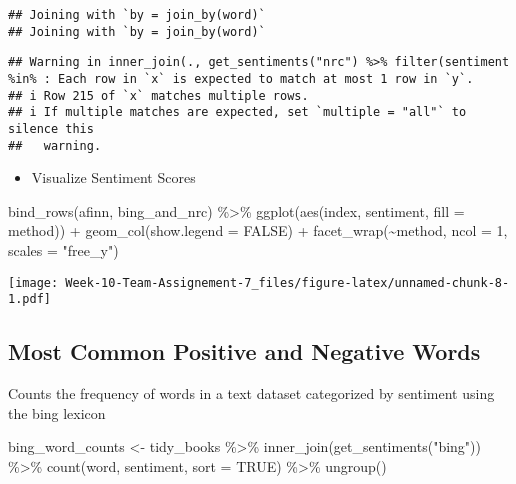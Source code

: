\documentclass[
]{article}
\newenvironment{Shaded}{\begin{snugshade}}{\end{snugshade}}
\newcommand{\AttributeTok}[1]{\textcolor[rgb]{0.77,0.63,0.00}{#1}}
\newcommand{\ConstantTok}[1]{\textcolor[rgb]{0.00,0.00,0.00}{#1}}
\newcommand{\DecValTok}[1]{\textcolor[rgb]{0.00,0.00,0.81}{#1}}
\newcommand{\FunctionTok}[1]{\textcolor[rgb]{0.00,0.00,0.00}{#1}}
\newcommand{\NormalTok}[1]{#1}
\newcommand{\OtherTok}[1]{\textcolor[rgb]{0.56,0.35,0.01}{#1}}
\newcommand{\SpecialCharTok}[1]{\textcolor[rgb]{0.00,0.00,0.00}{#1}}
\newcommand{\StringTok}[1]{\textcolor[rgb]{0.31,0.60,0.02}{#1}}
\providecommand{\tightlist}{%
  \setlength{\itemsep}{0pt}\setlength{\parskip}{0pt}}
\begin{document}
\begin{verbatim}
## Joining with `by = join_by(word)`
## Joining with `by = join_by(word)`
\end{verbatim}

\begin{verbatim}
## Warning in inner_join(., get_sentiments("nrc") %>% filter(sentiment %in% : Each row in `x` is expected to match at most 1 row in `y`.
## i Row 215 of `x` matches multiple rows.
## i If multiple matches are expected, set `multiple = "all"` to silence this
##   warning.
\end{verbatim}

\begin{itemize}
\tightlist
\item
  Visualize Sentiment Scores
\end{itemize}

\begin{Shaded}
\begin{Highlighting}[]
\FunctionTok{bind\_rows}\NormalTok{(afinn, }
\NormalTok{          bing\_and\_nrc) }\SpecialCharTok{\%\textgreater{}\%}
  \FunctionTok{ggplot}\NormalTok{(}\FunctionTok{aes}\NormalTok{(index, sentiment, }\AttributeTok{fill =}\NormalTok{ method)) }\SpecialCharTok{+}
  \FunctionTok{geom\_col}\NormalTok{(}\AttributeTok{show.legend =} \ConstantTok{FALSE}\NormalTok{) }\SpecialCharTok{+}
  \FunctionTok{facet\_wrap}\NormalTok{(}\SpecialCharTok{\textasciitilde{}}\NormalTok{method, }\AttributeTok{ncol =} \DecValTok{1}\NormalTok{, }\AttributeTok{scales =} \StringTok{"free\_y"}\NormalTok{)}
\end{Highlighting}
\end{Shaded}

\texttt{[image: Week-10-Team-Assignement-7\_files/figure-latex/unnamed-chunk-8-1.pdf]}

\hypertarget{most-common-positive-and-negative-words}{%
\subsection{Most Common Positive and Negative
Words}\label{most-common-positive-and-negative-words}}

Counts the frequency of words in a text dataset categorized by sentiment
using the bing lexicon

\begin{Shaded}
\begin{Highlighting}[]
\NormalTok{bing\_word\_counts }\OtherTok{\textless{}{-}}\NormalTok{ tidy\_books }\SpecialCharTok{\%\textgreater{}\%}
  \FunctionTok{inner\_join}\NormalTok{(}\FunctionTok{get\_sentiments}\NormalTok{(}\StringTok{"bing"}\NormalTok{)) }\SpecialCharTok{\%\textgreater{}\%}
  \FunctionTok{count}\NormalTok{(word, sentiment, }\AttributeTok{sort =} \ConstantTok{TRUE}\NormalTok{) }\SpecialCharTok{\%\textgreater{}\%}
  \FunctionTok{ungroup}\NormalTok{()}
\end{Highlighting}
\end{Shaded}
\end{document}
